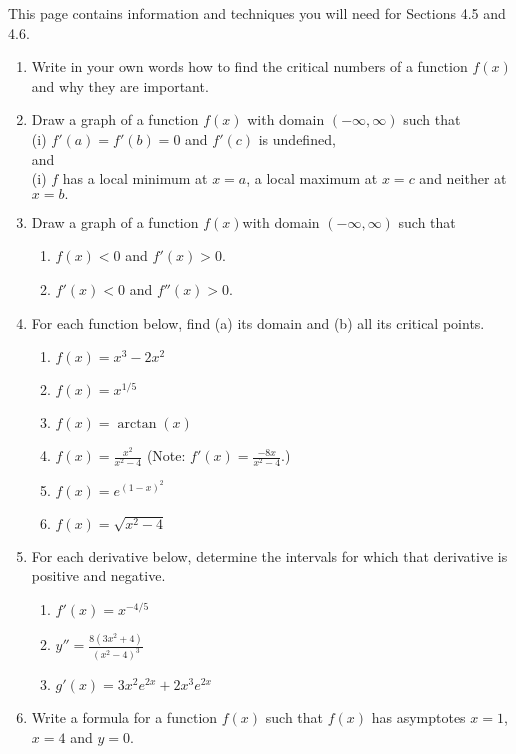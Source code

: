 \documentclass[12pt]{article}
\begin{document}
This page contains information and techniques you will need for Sections 4.5 and 4.6.
\begin{enumerate}
\item Write in your own words how to find the critical numbers of a function $f(x)$ and why they are important.
\vspace{1in}
\item Draw a graph of a function $f(x)$ with domain $(-\infty, \infty)$  such that \\
(i) $f'(a)=f'(b)=0$ and $f'(c)$ is undefined,\\
and\\
(i) $f$ has a local minimum at $x=a$, a local maximum at $x=c$ and neither at $x=b.$
\vfill
\item Draw a graph of a function $f(x)$with domain $(-\infty, \infty)$ such that \\
\begin{multicols}{2}
\begin{enumerate}
\item $f(x)<0$ and $f'(x) >0.$
\item $f'(x)<0$ and $f''(x) >0.$
\end{enumerate}
\end{multicols}
\vfill
\newpage
\item For each function below, find (a) its domain and (b) all its critical points.
	\begin{enumerate}
	\item $f(x)=x^3-2x^2$
	\vfill
	\item $f(x)=x^{1/5}$
	\vfill
	\item $f(x)=\arctan(x)$
	\vfill
	\item $f(x)=\frac{x^2}{x^2-4}$ (Note: $f'(x)=\frac{-8x}{x^2-4}.$)
	\vfill
	\item $f(x)=e^{(1-x)^2}$
	\vfill
	\item $f(x)=\sqrt{x^2-4}$
	\vfill
	\end{enumerate}
\newpage
\item For each derivative below, determine the intervals for which that derivative is positive and negative.
\begin{enumerate}
\item $f'(x)=x^{-4/5}$
\vfill
\item $y''=\frac{8(3x^2+4)}{(x^2-4)^3}$
\vfill
\item $g'(x)=3x^2e^{2x}+2x^3e^{2x}$
\vfill
\end{enumerate}
\newpage
\item Write a formula for a function $f(x)$ such that $f(x)$ has asymptotes $x=1$, $x=4$ and $y=0.$
\vspace{1in}


\end{enumerate}
\end{document}
